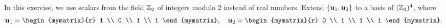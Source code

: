 \begin{ex}
  In this exercise, we use scalars from the field $\mathbb{Z}_2$ of integers
  modulo $2$ instead of real numbers.
  Extend $\left\{\mbox{\bf u}_1,\mbox{\bf u}_2\right\}$ to a basis of $(\mathbb{Z}_2)^4$, where
  \begin{equation*}
    \vect{u}_1 = \begin{mymatrix}{r} 1 \\ 0 \\ 1 \\ 1 \end{mymatrix},\quad
    \vect{u}_2 = \begin{mymatrix}{r} 0 \\ 1 \\ 1 \\ 1 \end{mymatrix}.
  \end{equation*}
\end{ex}

